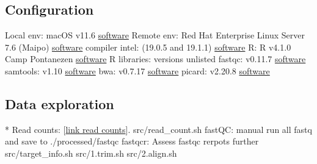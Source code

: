 \markdownRendererUlEndTight \markdownRendererInterblockSeparator
{}\subsection{Configuration}\markdownRendererInterblockSeparator
{}\markdownRendererUlBeginTight
\markdownRendererUlItem Local env: macOS v11.6 \href{https://support.apple.com/macos}{software}\markdownRendererUlItemEnd 
\markdownRendererUlItem Remote env: Red Hat Enterprise Linux Server 7.6 (Maipo) \href{https://www.redhat.com/en/technologies/linux-platforms/enterprise-linux}{software}\markdownRendererUlItemEnd 
\markdownRendererUlItem compiler intel: (19.0.5 and 19.1.1) \href{https://www.intel.com/content/www/us/en/developer/tools/oneapi/commercial-base-hpc.html#gs.ppyt3x}{software}\markdownRendererUlItemEnd 
\markdownRendererUlItem R: R v4.1.0 Camp Pontanezen \href{https://www.r-project.org}{software}\markdownRendererUlItemEnd 
\markdownRendererUlItem R libraries: versions unlisted\markdownRendererUlItemEnd 
\markdownRendererUlItem fastqc: v0.11.7 \href{https://www.bioinformatics.babraham.ac.uk/projects/fastqc/}{software}\markdownRendererUlItemEnd 
\markdownRendererUlItem samtools: v1.10 \href{https://www.htslib.org}{software}\markdownRendererUlItemEnd 
\markdownRendererUlItem bwa: v0.7.17 \href{https://janis.readthedocs.io/en/latest/tools/bioinformatics/bwa/bwamem.html}{software}\markdownRendererUlItemEnd 
\markdownRendererUlItem picard: v2.20.8 \href{http://broadinstitute.github.io/picard/}{software}\markdownRendererUlItemEnd 
\markdownRendererUlEndTight \markdownRendererInterblockSeparator
{}\subsection{Data exploration} * Read counts: [\href{https://github.com/DylanLawless/kit\markdownRendererEmphasis{assess/data/processed/read}counts/read_counts.txt}{link read counts}].\markdownRendererInterblockSeparator
{}\markdownRendererOlBeginTight
{}src/read_count.sh\markdownRendererOlItemEnd 
{}fastQC: manual run all fastq and save to ./processed/fastqc\markdownRendererOlItemEnd 
{}fastqcr: Assess fastqc rerpots further\markdownRendererOlItemEnd 
{}src/target_info.sh\markdownRendererOlItemEnd 
{}src/1.trim.sh\markdownRendererOlItemEnd 
{}src/2.align.sh\markdownRendererOlItemEnd 
